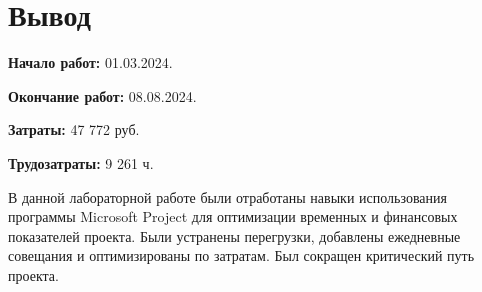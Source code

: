 \chapter*{Вывод}

\textbf{Начало работ:} 01.03.2024. 

\textbf{Окончание работ:} 08.08.2024.

\textbf{Затраты:} 47 772 руб.

\textbf{Трудозатраты:} 9 261 ч.

В данной лабораторной работе были отработаны навыки использования программы Microsoft Project для оптимизации временных и финансовых показателей проекта. Были устранены перегрузки, добавлены ежедневные совещания и оптимизированы по затратам. Был сокращен критический путь проекта.
